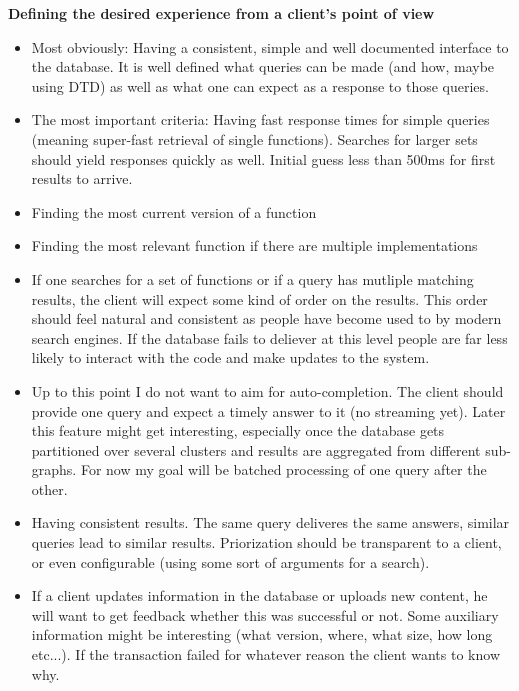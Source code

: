 \documentclass[11p]{scrartcl}
\begin{document}
\textbf{Defining the desired experience from a client's point of view}
\begin{itemize}
	\item Most obviously: Having a consistent, simple and well documented interface to the database. It is well defined what queries can be made (and how, maybe using DTD) as well as what one can expect as a response to those queries.
	\item The most important criteria: Having fast response times for simple queries (meaning super-fast retrieval of single functions). Searches for larger sets should yield responses quickly as well. Initial guess less than 500ms for first results to arrive.
	\item Finding the most current version of a function
	\item Finding the most relevant function if there are multiple implementations
	\item If one searches for a set of functions or if a query has mutliple matching results, the client will expect some kind of order on the results. This order should feel natural and consistent as people have become used to by modern search engines. If the database fails to deliever at this level people are far less likely to interact with the code and make updates to the system. 
	\item Up to this point I do not want to aim for auto-completion. The client should provide one query and expect a timely answer to it (no streaming yet). Later this feature might get interesting, especially once the database gets partitioned over several clusters and results are aggregated from different sub-graphs. For now my goal will be batched processing of one query after the other.
	\item Having consistent results. The same query deliveres the same answers, similar queries lead to similar results. Priorization should be transparent to a client, or even configurable (using some sort of arguments for a search).
	\item If a client updates information in the database or uploads new content, he will want to get feedback whether this was successful or not. Some auxiliary information might be interesting (what version, where, what size, how long etc...). If the transaction failed for whatever reason the client wants to know why.
\end{itemize}
\end{document}
